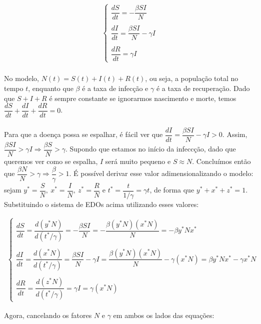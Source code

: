 \begin{gather*}
\begin{cases}
\dfrac{dS}{dt} = -\dfrac{\beta SI}{N} \\
\\
\dfrac{dI}{dt} = \dfrac{\beta SI}{N} - \gamma I \\
\\
\dfrac{dR}{dt} = \gamma I
\end{cases}
\end{gather*}
\\
No modelo, $N(t) = S(t)+I(t)+R(t)$, ou seja, a população total no tempo $t$, enquanto que $\beta$ é a taxa de infecção e $\gamma$ é a taxa de recuperação. Dado que $S+I+R$ é sempre constante se ignorarmos nascimento e morte, temos $\dfrac{dS}{dt}+\dfrac{dI}{dt}+\dfrac{dR}{dt} = 0$. 
\\\\
Para que a doença possa se espalhar, é fácil ver que $\dfrac{dI}{dt} = \dfrac{\beta SI}{N} - \gamma I > 0$. Assim, $\dfrac{\beta SI}{N} > \gamma I \Rightarrow \dfrac{\beta S}{N} > \gamma$. Supondo que estamos no início da infeccção, dado que queremos ver como se espalha, $I$ será muito pequeno e $S \approx N$. Concluímos então que $\dfrac{\beta N}{N} > \gamma \Rightarrow \dfrac{\beta}{\gamma} > 1$. É possível derivar esse valor adimensionalizando o modelo: sejam $y^* = \dfrac{S}{N}, \ x^* = \dfrac{I}{N}, \ z^* = \dfrac{R}{N}$ e $t^*=\dfrac{t}{1/\gamma} = \gamma t$, de forma que $y^*+x^*+z^*=1$. Substituindo o sistema de EDOs acima utilizando esses valores:

\begin{gather*}
\begin{cases}
\dfrac{dS}{dt} = \dfrac{d(y^*N)}{d(t^*/\gamma)} = -\dfrac{\beta SI}{N} = -\dfrac{\beta(y^*N)(x^*N)}{N} = -\beta y^*Nx^* \\
\\
\dfrac{dI}{dt} = \dfrac{d(x^*N)}{d(t^*/\gamma)} = \dfrac{\beta SI}{N} - \gamma I = \dfrac{\beta(y^*N)(x^*N)}{N} -\gamma(x^*N) = \beta y^*Nx^* - \gamma x^*N \\
\\
\dfrac{dR}{dt} = \dfrac{d(z^*N)}{d(t^*/\gamma)} = \gamma I = \gamma(x^*N)
\end{cases}
\end{gather*}

Agora, cancelando os fatores $N$ e $\gamma$ em ambos os lados das equações:

